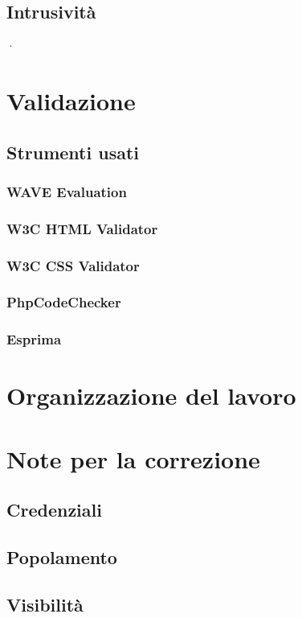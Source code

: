 \documentclass[a4paper]{article}
\begin{document}
		\subsection{Intrusività}·
			
		
	\newpage

	\section{Validazione}
		\subsection{Strumenti usati}
			
			\subsubsection{WAVE Evaluation}
				
			\subsubsection{W3C HTML Validator}
				
			\subsubsection{W3C CSS Validator}
				
			\subsubsection{PhpCodeChecker}
				
			\subsubsection{Esprima}
				
				
	\newpage

	\section{Organizzazione del lavoro}
		
	
	\newpage
	
	\appendix
	\section{Note per la correzione}
		
		\subsection{Credenziali}
			
		\subsection{Popolamento}
			
		\subsection{Visibilità}
			
    
\end{document}
